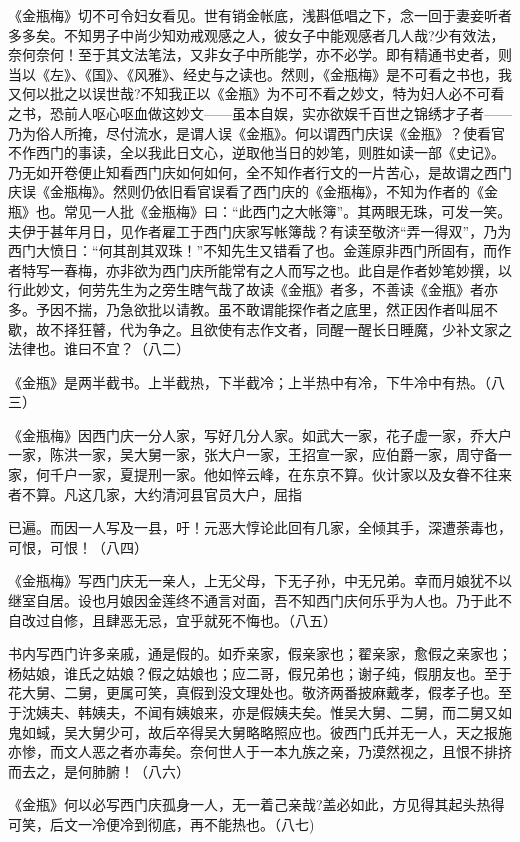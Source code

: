 \begin{showcontents}{}
{《金瓶梅》切不可令妇女看见。世有销金帐底，浅斟低唱之下，念一回于妻妾听者多多矣。不知男子中尚少知劝戒观感之人，彼女子中能观感者几人哉?少有效法，奈何奈何！至于其文法笔法，又非女子中所能学，亦不必学。即有精通书史者，则当以《左》、《国》、《风雅》、经史与之读也。然则，《金瓶梅》是不可看之书也，我又何以批之以误世哉?不知我正以《金瓶》为不可不看之妙文，特为妇人必不可看之书，恐前人呕心呕血做这妙文——虽本自娱，实亦欲娱千百世之锦绣才子者——乃为俗人所掩，尽付流水，是谓人误《金瓶》。何以谓西门庆误《金瓶》？使看官不作西门的事读，全以我此日文心，逆取他当日的妙笔，则胜如读一部《史记》。乃无如开卷便止知看西门庆如何如何，全不知作者行文的一片苦心，是故谓之西门庆误《金瓶梅》。然则仍依旧看官误看了西门庆的《金瓶梅》，不知为作者的《金瓶》也。常见一人批《金瓶梅》曰：“此西门之大帐簿”。其两眼无珠，可发一笑。夫伊于甚年月日，见作者雇工于西门庆家写帐簿哉？有读至敬济“弄一得双”，乃为西门大愤日：“何其剖其双珠！”不知先生又错看了也。金莲原非西门所固有，而作者特写一春梅，亦非欲为西门庆所能常有之人而写之也。此自是作者妙笔妙撰，以行此妙文，何劳先生为之旁生瞎气哉了故读《金瓶》者多，不善读《金瓶》者亦多。予因不揣，乃急欲批以请教。虽不敢谓能探作者之底里，然正因作者叫屈不歇，故不择狂瞽，代为争之。且欲使有志作文者，同醒一醒长日睡魔，少补文家之法律也。谁曰不宜？（八二）

《金瓶》是两半截书。上半截热，下半截冷；上半热中有冷，下牛冷中有热。（八三）

《金瓶梅》因西门庆一分人家，写好几分人家。如武大一家，花子虚一家，乔大户一家，陈洪一家，吴大舅一家，张大户一家，王招宣一家，应伯爵一家，周守备一家，何千户一家，夏提刑一家。他如悴云峰，在东京不算。伙计家以及女眷不往来者不算。凡这几家，大约清河县官员大户，屈指

已遍。而因一人写及一县，吁！元恶大惇论此回有几家，全倾其手，深遭荼毒也，可恨，可恨！（八四）

《金瓶梅》写西门庆无一亲人，上无父母，下无子孙，中无兄弟。幸而月娘犹不以继室自居。设也月娘因金莲终不通言对面，吾不知西门庆何乐乎为人也。乃于此不自改过自修，且肆恶无忌，宜乎就死不悔也。（八五）

书内写西门许多亲戚，通是假的。如乔亲家，假亲家也；翟亲家，愈假之亲家也；杨姑娘，谁氏之姑娘？假之姑娘也；应二哥，假兄弟也；谢子纯，假朋友也。至于花大舅、二舅，更属可笑，真假到没文理处也。敬济两番披麻戴孝，假孝子也。至于沈姨夫、韩姨夫，不闻有姨娘来，亦是假姨夫矣。惟吴大舅、二舅，而二舅又如鬼如蜮，吴大舅少可，故后卒得吴大舅略略照应也。彼西门氏并无一人，天之报施亦惨，而文人恶之者亦毒矣。奈何世人于一本九族之亲，乃漠然视之，且恨不排挤而去之，是何肺腑！（八六）

《金瓶》何以必写西门庆孤身一人，无一着己亲哉?盖必如此，方见得其起头热得可笑，后文一冷便冷到彻底，再不能热也。（八七)

}
\end{showcontents}
